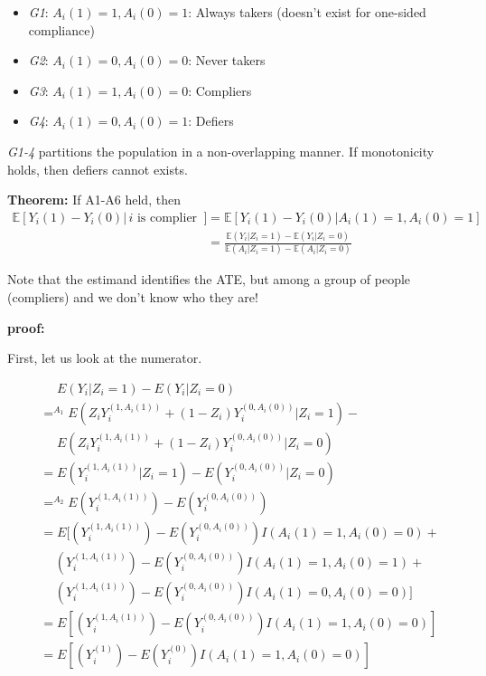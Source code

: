 \documentclass[
]{book}
\providecommand{\tightlist}{%
  \setlength{\itemsep}{0pt}\setlength{\parskip}{0pt}}
\begin{document}
\begin{itemize}
\tightlist
\item
  \emph{G1}: \(A_i(1) =1,A_i(0) =1\): Always takers (doesn't exist for one-sided compliance)
\item
  \emph{G2}: \(A_i(1) =0,A_i(0) =0\): Never takers
\item
  \emph{G3}: \(A_i(1) =1,A_i(0) =0\): Compliers
\item
  \emph{G4}: \(A_i(1) =0,A_i(0) =1\): Defiers
\end{itemize}

\emph{G1-4} partitions the population in a non-overlapping manner. If monotonicity holds, then defiers cannot exists.

\textbf{Theorem:} If A1-A6 held, then
\begin{align*}\mathbb{E}[Y_i(1) - Y_i(0) | \,i\text{ is complier }] &= \mathbb{E}[Y_i(1) - Y_i(0) | A_i(1)=1, A_i(0)=1] \\
&= \frac{\mathbb{E}(Y_i | Z_i=1)-\mathbb{E}(Y_i | Z_i=0)}{\mathbb{E}(A_i | Z_i=1)- \mathbb{E}(A_i | Z_i=0)}
\end{align*}

Note that the estimand identifies the ATE, but among a group of people (compliers) and we don't know who they are!

\textbf{proof:}

First, let us look at the numerator.

\begin{align*}
&\,\,\,\,\,\,\,\,E(Y_i |Z_i=1) - E(Y_i|Z_i=0) \\
&=^{A_1} E(Z_iY_i^{(1,A_i(1))}+(1-Z_i)Y_i^{(0,A_i(0))} |Z_i=1  )-\\
&\,\,\,\,\,\,\,\,E(Z_iY_i^{(1,A_i(1))}+(1-Z_i)Y_i^{(0,A_i(0))} |Z_i=0  ) \\
&= E(Y_i^{(1, A_i(1))}|Z_i=1) - E(Y_i^{(0, A_i(0))}|Z_i=0) \\
&=^{A_2} E(Y_i^{(1, A_i(1))}) - E(Y_i^{(0, A_i(0))}) \\
&= E[ (Y_i^{(1, A_i(1))}) - E(Y_i^{(0, A_i(0))})I(A_i(1)=1,A_i(0)=0)+\\
&\,\,\,\,\,\,\,(Y_i^{(1, A_i(1))}) - E(Y_i^{(0, A_i(0))})I(A_i(1)=1,A_i(0)=1)+\\
&\,\,\,\,\,\,\,(Y_i^{(1, A_i(1))}) - E(Y_i^{(0, A_i(0))})I(A_i(1)=0,A_i(0)=0)]\\
& = E[ (Y_i^{(1, A_i(1))}) - E(Y_i^{(0, A_i(0))})I(A_i(1)=1,A_i(0)=0) ] \\
& = E[ (Y_i^{(1)}) - E(Y_i^{(0)})I(A_i(1)=1,A_i(0)=0) ]
\end{align*}
\end{document}

